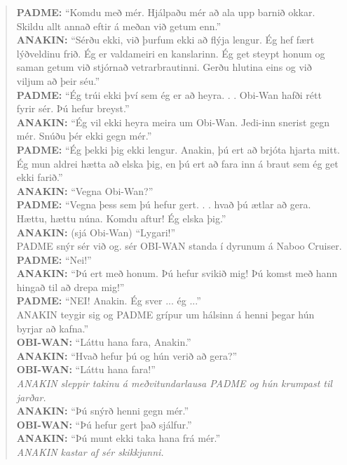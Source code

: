 \begin{quote}
    \textbf{PADME:} ``Komdu með mér. Hjálpaðu mér að ala upp barnið okkar. Skildu allt annað eftir á meðan við getum enn.''\\
    \textbf{ANAKIN:} ``Sérðu ekki, við þurfum ekki að flýja lengur. Ég hef fært lýðveldinu frið. Ég er valdameiri en kanslarinn. Ég get steypt honum og saman getum við stjórnað vetrarbrautinni. Gerðu hlutina eins og við viljum að þeir séu.''\\
    \textbf{PADME:} ``Ég trúi ekki því sem ég er að heyra. . . Obi-Wan hafði rétt fyrir sér. Þú hefur breyst.''\\
    \textbf{ANAKIN:} ``Ég vil ekki heyra meira um Obi-Wan. Jedi-inn snerist gegn mér. Snúðu þér ekki gegn mér.''\\
    \textbf{PADME:} ``Ég þekki þig ekki lengur. Anakin, þú ert að brjóta hjarta mitt. Ég mun aldrei hætta að elska þig, en þú ert að fara inn á braut sem ég get ekki farið.''\\
    \textbf{ANAKIN:} ``Vegna Obi-Wan?''\\
    \textbf{PADME:} ``Vegna þess sem þú hefur gert. . . hvað þú ætlar að gera. Hættu, hættu núna. Komdu aftur! Ég elska þig.''\\
    \textbf{ANAKIN:} (sjá Obi-Wan) ``Lygari!''\\
    PADME snýr sér við og. sér OBI-WAN standa í dyrunum á Naboo Cruiser.\\
    \textbf{PADME:} ``Nei!''\\
    \textbf{ANAKIN:} ``Þú ert með honum. Þú hefur svikið mig! Þú komst með hann hingað til að drepa mig!''\\
    \textbf{PADME:} ``NEI! Anakin. Ég sver ... ég ...''\\
    ANAKIN teygir sig og PADME grípur um hálsinn á henni þegar hún byrjar að kafna.''\\
    \textbf{OBI-WAN:} ``Láttu hana fara, Anakin.''\\
    \textbf{ANAKIN:} ``Hvað hefur þú og hún verið að gera?''\\
    \textbf{OBI-WAN:} ``Láttu hana fara!''\\
    \textit{ANAKIN sleppir takinu á meðvitundarlausa PADME og hún krumpast til jarðar.}\\
    \textbf{ANAKIN:} ``Þú snýrð henni gegn mér.''\\
    \textbf{OBI-WAN:} ``Þú hefur gert það sjálfur.''\\
    \textbf{ANAKIN:} ``Þú munt ekki taka hana frá mér.''\\
    \textit{ANAKIN kastar af sér skikkjunni.}\\

\end{quote}
